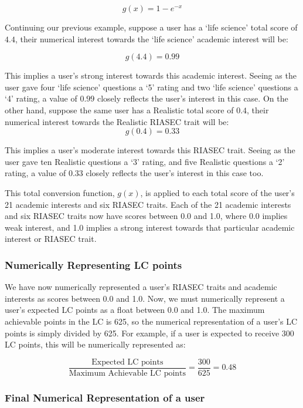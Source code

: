 \[ g(x) = 1 - e^{-x} \]

Continuing our previous example, suppose a user has a `life science' total score of $4.4$,
their numerical interest towards the `life science' academic interest will be:

\[g(4.4) = 0.99\]

This implies a user's strong interest towards this academic interest. 
Seeing as the user gave four `life science' questions a `5' rating and two `life science' questions 
a `4' rating, a value of $0.99$ closely reflects the user's interest in this case.
On the other hand, suppose the same user has a Realistic total score of $0.4$,
their numerical interest towards the Realistic RIASEC trait will be: 
\[g(0.4) = 0.33\]

This implies a user's moderate interest towards this RIASEC trait.
Seeing as the user gave ten Realistic questions a `3' rating, and five Realistic questions a `2' rating,
a value of $0.33$ closely reflects the user's interest in this case too.

This total conversion function, $g(x)$, is applied to each total score of the user's 21 academic interests and six RIASEC traits.
Each of the 21 academic interests and six RIASEC traits now have scores between 0.0 and 1.0,
where 0.0 implies weak interest, and 1.0 implies a strong interest towards that particular academic interest or RIASEC trait.

\subsubsection{Numerically Representing LC points}

We have now numerically represented a user's RIASEC traits and academic interests as scores between 0.0 and 1.0. 
Now, we must numerically represent a user's expected LC points as a float between 0.0 and 1.0.
The maximum achievable points in the LC is 625, so the numerical representation of a user's LC points is simply 
divided by 625. For example, if a user is expected to receive 300 LC points, this will be numerically represented as:

\[ \frac{\text{Expected LC points}}{\text{Maximum Achievable LC points}} = \frac{300}{625} = 0.48 \]

\subsubsection{Final Numerical Representation of a user}

